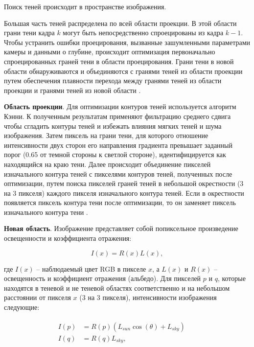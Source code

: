 Поиск теней происходит в пространстве изображения. 

Большая часть теней распределена по всей области проекции. В этой области грани тени кадра $k$ могут быть непосредственно спроецированы из кадра $k - 1$. Чтобы устранить ошибки проецирования, вызванные зашумленными параметрами камеры и данными о глубине, происходит оптимизация первоначально спроецированных граней тени в области проецирования. Грани тени в новой области обнаруживаются и объединяются с гранями теней из области проекции путем обеспечения плавности перехода между гранями теней из области проекции и гранями теней из новой области \cite{wei2019simulating}.

\textbf{Область проекции}. Для оптимизации контуров теней используется алгоритм Кэнни. К полученным результатам применяют фильтрацию среднего сдвига чтобы сгладить контуры теней и избежать влияния мягких теней и шума изображения. Затем пиксель на грани тени, для которого отношение интенсивности двух сторон его направления градиента превышает заданный порог (0.65 от темной стороны к светлой стороне), идентифицируется как находящийся на краю тени. Далее происходит объединение пикселей изначального контура теней с пикселями контуров теней, полученных после оптимизации, путем поиска пикселей граней теней в небольшой окрестности (3 на 3 пикселя) каждого пикселя изначального контура теней. Если в окрестности появляется пиксель контура тени после оптимизации, то он заменяет пиксель изначального контура тени \cite{wei2019simulating}.

\textbf{Новая область}. Изображение представляет собой попиксельное произведение освещенности и коэффициента отражения: 

\begin{equation}
	I(x) = R(x)L(x), 
\end{equation}

где $I(x)$ -- наблюдаемый цвет RGB в пикселе $x$, а $L(x)$ и $R(x)$ -- освещенность и коэффициент отражения (альбедо). Для пикселей $p$ и $q$, которые находятся в теневой и не теневой областях соответственно и на небольшом расстоянии от пикселя $x$ (3 на 3 пикселя), интенсивности изображения следующие:

\begin{equation}
	\begin{aligned}
		\begin{split}
			I(p) &= R(p)(L_{sun} \cos(\theta) + L_{sky}) &&\\
			I(q) &= R(q)L_{sky}, &&
		\end{split}
	\end{aligned}
\end{equation}

